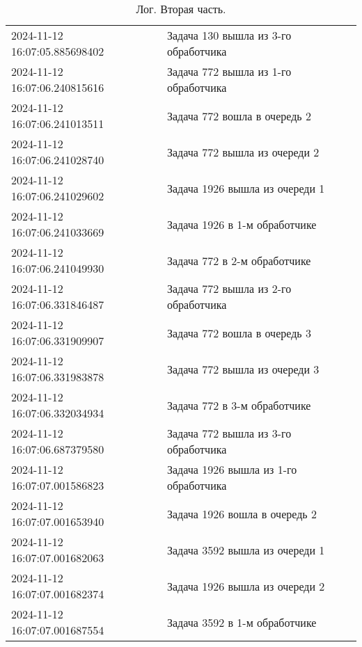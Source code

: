 \begin{table}[h]
	\begin{center}
		\begin{threeparttable}
		\captionsetup{justification=raggedright,singlelinecheck=off}
		\caption{Лог. Вторая часть.}
		\label{tbl:log2}
                    \begin{tabular}{|l|l|}
                        \hline
                        2024-11-12 16:07:05.885698402 & Задача 130 вышла из 3-го обработчика\\
                        2024-11-12 16:07:06.240815616 & Задача 772 вышла из 1-го обработчика\\
                        2024-11-12 16:07:06.241013511 & Задача 772 вошла в очередь 2\\
                        2024-11-12 16:07:06.241028740 & Задача 772 вышла из очереди 2\\
                        2024-11-12 16:07:06.241029602 & Задача 1926 вышла из очереди 1\\
                        2024-11-12 16:07:06.241033669 & Задача 1926 в 1-м обработчике\\
                        2024-11-12 16:07:06.241049930 & Задача 772 в 2-м обработчике\\
                        2024-11-12 16:07:06.331846487 & Задача 772 вышла из 2-го обработчика\\
                        2024-11-12 16:07:06.331909907 & Задача 772 вошла в очередь 3\\
                        2024-11-12 16:07:06.331983878 & Задача 772 вышла из очереди 3\\
                        2024-11-12 16:07:06.332034934 & Задача 772 в 3-м обработчике\\
                        2024-11-12 16:07:06.687379580 & Задача 772 вышла из 3-го обработчика\\
                        2024-11-12 16:07:07.001586823 & Задача 1926 вышла из 1-го обработчика\\
                        2024-11-12 16:07:07.001653940 & Задача 1926 вошла в очередь 2\\
                        2024-11-12 16:07:07.001682063 & Задача 3592 вышла из очереди 1\\
                        2024-11-12 16:07:07.001682374 & Задача 1926 вышла из очереди 2\\
                        2024-11-12 16:07:07.001687554 & Задача 3592 в 1-м обработчике\\

\end{tabular}
\end{threeparttable}
\end{center}
\end{table}
